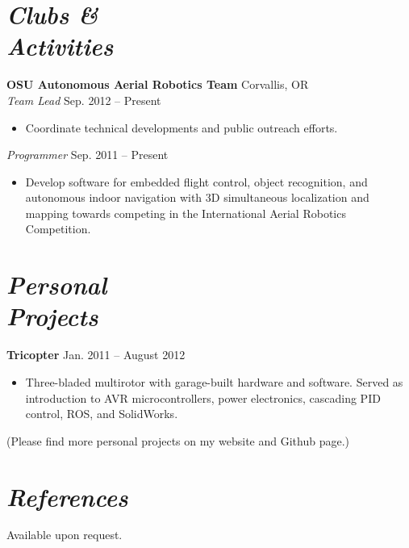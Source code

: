 \documentclass[10pt,letterpaper,margin]{res}
\begin{document}
\begin{resume}
\section{\large\itshape Clubs \& \\ Activities}

{\bf OSU Autonomous Aerial Robotics Team} \hfill {\color{lightgray} Corvallis, OR} \\
{\it Team Lead} \hfill {\color{lightgray} Sep. 2012 -- Present}\vspace{0.2em}

\begin{itemize}
	\item Coordinate technical developments and public outreach efforts.
\end{itemize}

{\it Programmer} \hfill {\color{lightgray} Sep. 2011 -- Present}\vspace{0.2em}

\begin{itemize}
	\item Develop software for embedded flight control, object recognition, and
		autonomous indoor navigation with 3D simultaneous localization and
		mapping towards competing in the International Aerial Robotics
		Competition.
\end{itemize}



\section{\large\itshape Personal \\ Projects}

{\bf Tricopter} \hfill {\color{lightgray} Jan. 2011 -- August 2012}\vspace{0.2em}

\begin{itemize}
	\item Three-bladed multirotor with garage-built hardware and software.
		Served as introduction to AVR microcontrollers, power electronics,
		cascading PID control, ROS, and SolidWorks.
\end{itemize}

{\footnotesize (Please find more personal projects on my website and Github page.)}



\section{\large\itshape References}

Available upon request.

\end{resume}
\end{document}
